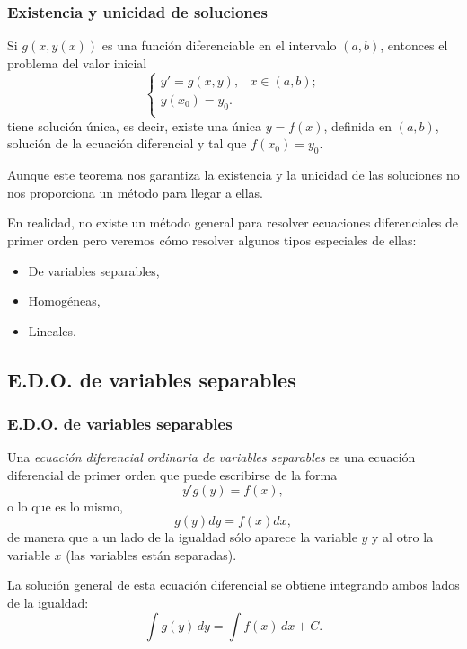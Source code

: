 \begin{frame}
	\frametitle{Existencia y unicidad de soluciones}
	\begin{teorema}
		Si $g(x,y(x))$ es una función diferenciable en el intervalo $(a,b)$, entonces el problema del valor inicial
		\[
			\left\{%
			\begin{array}{ll}
				y'=g(x,y), & x\in (a,b); \\
				y(x_0)=y_0.\\
			\end{array}%
			\right.
		\]   
		tiene solución única, es decir, existe una única $y=f(x)$, definida en $(a,b)$, solución de la ecuación diferencial y tal que $f(x_0)=y_0$.
	\end{teorema}
		
	Aunque este teorema nos garantiza la existencia y la unicidad de las soluciones no nos proporciona un método para llegar a ellas.
		
	En realidad, no existe un método general para resolver ecuaciones diferenciales de primer orden pero veremos cómo resolver algunos tipos especiales de ellas:
	\begin{itemize}
		\item De variables separables,
		\item Homogéneas,
		\item Lineales.
	\end{itemize}
\end{frame}



\subsection{E.D.O. de variables separables}
\begin{frame}
	\frametitle{E.D.O. de variables separables}
	\begin{definicion}
		Una \emph{ecuación diferencial ordinaria de variables separables} es una ecuación diferencial de primer orden que puede escribirse de la forma
		\[y'g(y)=f(x),\]
		o lo que es lo mismo,
		\[g(y)dy=f(x)dx,\]
		de manera que a un lado de la igualdad sólo aparece la variable $y$ y al otro la variable $x$ (las variables están separadas).
	\end{definicion}
		
	La solución general de esta ecuación diferencial se obtiene integrando ambos lados de la igualdad:
	\[\int g(y)\,dy = \int f(x)\,dx+C.\]
\end{frame}


